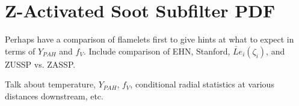 \section{Z-Activated Soot Subfilter PDF}
\label{sec:lesresults:zassp}

Perhaps have a comparison of flamelets first to give hints at what to expect in terms of $Y_{PAH}$ and $f_V$. Include comparison of EHN, Stanford, $\check{Le}_i(\zeta_i)$, and ZUSSP vs. ZASSP.

Talk about temperature, $Y_{PAH}$, $f_V$, conditional radial statistics at various distances downstream, etc.
